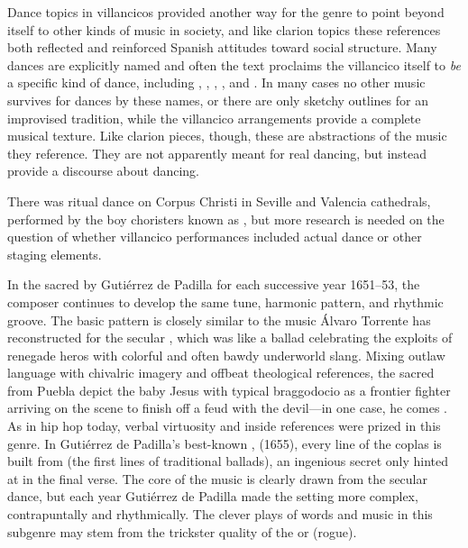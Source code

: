 Dance topics in villancicos provided another way for the genre to point beyond
itself to other kinds of music in society, and like clarion topics these
references both reflected and reinforced Spanish attitudes toward social
structure.
Many dances are explicitly named and often the text proclaims the villancico
itself to \emph{be} a specific kind of dance, including ,
, , , and
.
In many cases no other music survives for dances by these names, or there are
only sketchy outlines for an improvised tradition, while the villancico
arrangements provide a complete musical texture.%
    \Autocites[For example,][]{Ruiz:Luz}
    [inventively reconstructed,][]{Lawrence-King:DancesCD}
Like clarion pieces, though, these are abstractions of the music they
reference.
They are not apparently meant for real dancing, but instead provide a discourse
about dancing.%
\begin{Footnote}
    There was ritual dance on Corpus Christi in Seville and Valencia
    cathedrals, performed by the boy choristers known as , but
    more research is needed on the question of whether villancico performances
    included actual dance or other staging elements.%
    \Autocite{Comes:Danzas}
\end{Footnote}


In the sacred  by Gutiérrez de Padilla for each successive year
1651--53, the composer continues to develop the same tune, harmonic pattern,
and rhythmic groove.
The basic pattern is closely similar to the music Álvaro Torrente has
reconstructed for the secular , which was like a ballad
celebrating the exploits of renegade heros with colorful and often bawdy
underworld slang.%
    \Autocites
    {Torrente:Jacara}
    [512--514]{Torrente:VC-chapter}
Mixing outlaw language with chivalric imagery and offbeat theological
references, the sacred  from Puebla depict the baby Jesus with
typical braggodocio as a frontier fighter arriving on the scene to finish off
a feud with the devil---in one case, he comes .
As in hip hop today, verbal virtuosity and inside references were prized in
this genre. 
In Gutiérrez de Padilla's best-known ,  (1655), every line of the coplas is built from  (the first lines of traditional  ballads), an
ingenious secret only hinted at in the final verse.
The core of the music is clearly drawn from the secular dance, but each year
Gutiérrez de Padilla made the setting more complex, contrapuntally and
rhythmically.
The clever plays of words and music in this subgenre may stem from the
trickster quality of the  or  (rogue).

